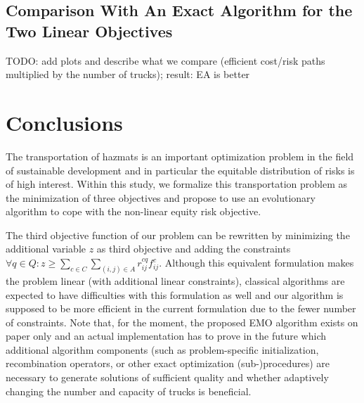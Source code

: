 \documentclass[preprint,12pt]{elsarticle}
\newcommand{\TODO}[1]{{\color{red}TODO: #1}}
\begin{document}
\subsection{Comparison With An Exact Algorithm for the Two Linear Objectives}
\TODO{add plots and describe what we compare (efficient cost/risk paths multiplied by the number of trucks); result: EA is better}


\section{Conclusions}
\label{S_FW}
The transportation of hazmats is an important optimization problem in the field of sustainable development and in particular the equitable distribution of risks is of high interest. Within this study, we formalize this transportation problem as the minimization of three objectives and propose to use an evolutionary algorithm to cope with the non-linear equity risk objective.

The third objective function of our problem can be rewritten by minimizing the additional variable $z$ as third objective and adding the constraints $\forall q \in Q: z \geq \sum_{c \in C} \sum_{(i,j) \in A} r_{ij}^{cq} f_{ij}^c$. Although this equivalent formulation makes the problem linear (with additional linear constraints), classical algorithms are expected to have difficulties with this formulation as well and our algorithm is supposed to be more efficient in the current formulation due to the fewer number of constraints. Note that, for the moment, the proposed EMO algorithm exists on paper only and an actual implementation has to prove in the future which additional algorithm components (such as problem-specific initialization, recombination operators, or other exact optimization (sub-)procedures) are necessary to generate solutions of sufficient quality and whether adaptively changing the number and capacity of trucks is beneficial.




\end{document}
